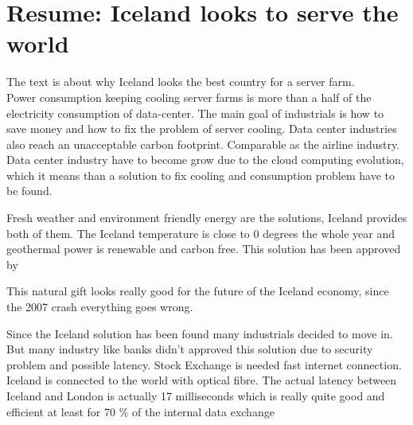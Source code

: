 \documentclass[a4paper,12pt]{report}
\author{Douaille Erwan}
\title{}
\begin{document}
\section*{Resume: Iceland looks to serve the world}

The text is about why Iceland looks the best country for a server farm.\\

Power consumption keeping cooling server farms is more than a half of the electricity consumption of data-center. The main goal of industrials is how to save money and how to fix the problem of server cooling. Data center industries also reach an unacceptable carbon footprint. Comparable as the airline industry. Data center industry have to become grow due to the cloud computing evolution, which it means than a solution to fix cooling and consumption problem have to be found. 

Fresh weather and environment friendly energy are the solutions, Iceland provides both of them. The Iceland temperature is close to 0 degrees the whole year and geothermal power is renewable and carbon free. This solution has been approved by 

This natural gift looks really good for the future of the Iceland economy, since the 2007 crash everything goes wrong.

Since the Iceland solution has been found many industrials decided to move in. But many industry like banks didn't approved this solution due to security problem and possible latency. Stock Exchange is needed fast internet connection. Iceland is connected to the world with optical fibre. The actual latency between Iceland and London is actually 17 milliseconds which is really quite good and efficient at least for 70 \% of the internal data exchange
\end{document}

